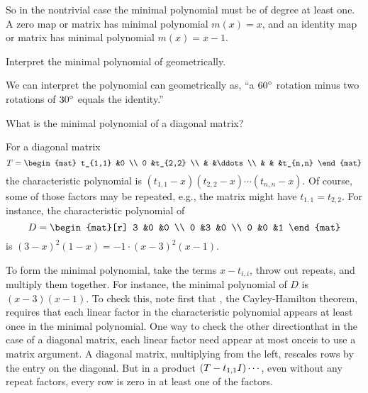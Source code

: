 \begin{exercises}
\begin{answer}
         So in the nontrivial case the minimal polynomial must be of degree
         at least one.
         A zero map or matrix has minimal polynomial \( m(x)=x \), and an
         identity map or matrix has minimal polynomial \( m(x)=x-1 \). 
       \end{answer}
  \recommended \item 
     Interpret the minimal polynomial of 
      geometrically.
     \begin{answer}
       We can interpret the polynomial can geometrically as, ``a \( 60^\circ\relax \)
       rotation minus two rotations of \( 30^\circ\relax \) equals the
       identity.''
     \end{answer}
   \item 
     What is the minimal polynomial of a diagonal matrix?
     \begin{answer}
       For a diagonal matrix
       \begin{equation*}
          T=
          \begin{mat}
             t_{1,1}   &0        \\
             0         &t_{2,2}  \\
                       &        &\ddots  \\
                       &        &      &t_{n,n}
          \end{mat}
       \end{equation*}
       the characteristic polynomial is 
       $(t_{1,1}-x)(t_{2,2}-x)\cdots (t_{n,n}-x)$.     
       Of course, some of those factors may be repeated, e.g., the matrix might
       have $t_{1,1}=t_{2,2}$.
       For instance, the characteristic polynomial of
       \begin{equation*}
          D=
          \begin{mat}[r]
             3 &0 &0  \\
             0 &3 &0  \\
             0 &0 &1
          \end{mat}
       \end{equation*}
       is \( (3-x)^2(1-x)=-1\cdot (x-3)^2(x-1) \). 

       To form the minimal polynomial, 
       take the terms \( x-t_{i,i} \), throw out repeats, 
       and multiply them together.
       For instance, the minimal polynomial of $D$
       is \( (x-3)(x-1) \).
       To check this, note first that , 
       the Cayley-Hamilton theorem, requires that each linear factor in the
       characteristic polynomial appears at least once in the minimal
       polynomial.
       One way to check the other direction\Dash that in the case of
       a diagonal matrix, 
       each linear factor need appear at most once\Dash is to
       use a matrix argument.
       A diagonal matrix, multiplying from the left, rescales rows by
       the entry on the diagonal.
       But in a product $(T-t_{1,1}I)\cdots\hbox{}$, even without any repeat
       factors, every row is zero in at least one of the factors. 


\end{answer}
\end{exercises}
